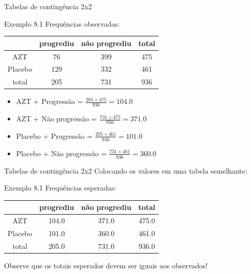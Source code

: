 \documentclass{beamer}
\begin{document}
\begin{frame}{Tabelas de contingência 2x2}
  \begin{exampleblock}{Exemplo 8.1}
    Frequências observadas:
    \begin{tabular}{c|c|c|c}
      & progrediu & não progrediu & total\\
      \hline
      AZT & 76 & 399 & 475\\
      \hline
      Placebo & 129 & 332 & 461\\
      \hline
      total & 205 & 731 & 936\\
    \end{tabular}
  \end{exampleblock}
  \vfill
  \begin{itemize}
    \scriptsize
  \item AZT + Progressão = $\frac{205 \times 475}{936} = 104.0$
  \item AZT + Não progressão = $\frac{731 \times 475}{936} = 371.0$
  \item Placebo + Progressão = $\frac{205 \times 461}{936} = 101.0$
  \item Placebo + Não progressão = $\frac{731 \times 461}{936} = 360.0$
  \end{itemize}
\end{frame}

\begin{frame}{Tabelas de contingência 2x2}
Colocando os valores em uma tabela semelhante:
  \begin{exampleblock}{Exemplo 8.1}
    Frequências esperadas:
    \begin{tabular}{c|c|c|c}
      & progrediu & não progrediu & total\\
      \hline
      AZT & 104.0 & 371.0 & 475.0\\
      \hline
      Placebo & 101.0 & 360.0 & 461.0\\
      \hline
      total & 205.0 & 731.0 & 936.0\\
    \end{tabular}
  \end{exampleblock}
Observe que os totais esperados devem ser iguais aos observados!
\end{frame}
\end{document}
